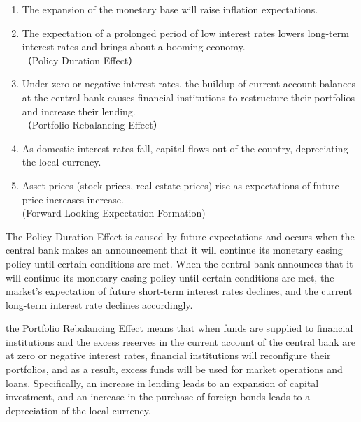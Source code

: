 \documentclass[12pt]{article}
\begin{document}
\begin{enumerate}
    \setlength{\leftskip}{30pt}
    \item The expansion of the monetary base will raise inflation expectations.
    \item The expectation of a prolonged period of low interest rates lowers long-term interest rates and brings about a booming economy.\\（Policy Duration Effect）
    \item Under zero or negative interest rates, the buildup of current account balances at the central bank causes financial institutions to restructure their portfolios and increase their lending.\\（Portfolio Rebalancing Effect）
    \item As domestic interest rates fall, capital flows out of the country, depreciating the local currency.
    \item Asset prices (stock prices, real estate prices) rise as expectations of future price increases increase.\\ (Forward-Looking Expectation Formation)
\end{enumerate}

The Policy Duration Effect is caused by future expectations and occurs when the central bank makes an announcement that it will continue its monetary easing policy until certain conditions are met.
When the central bank announces that it will continue its monetary easing policy until certain conditions are met, the market's expectation of future short-term interest rates declines, and the current long-term interest rate declines accordingly.

the Portfolio Rebalancing Effect means that when funds are supplied to financial institutions and the excess reserves in the current account of the central bank are at zero or negative interest rates, financial institutions will reconfigure their portfolios,
and as a result, excess funds will be used for market operations and loans.
Specifically, an increase in lending leads to an expansion of capital investment, and an increase in the purchase of foreign bonds leads to a depreciation of the local currency.
\end{document}
